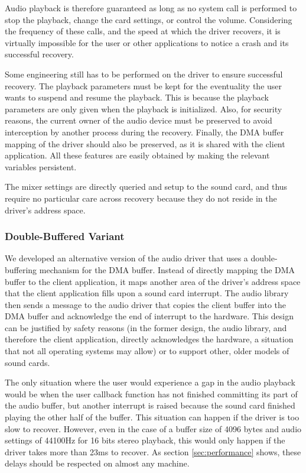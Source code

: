 \documentclass{report}
\begin{document}
Audio playback is therefore guaranteed as long as no system call is performed to stop the playback, change the card settings, or control the volume. Considering the frequency of these calls, and the speed at which the driver recovers, it is virtually impossible for the user or other applications to notice a crash and its successful recovery.

Some engineering still has to be performed on the driver to ensure successful recovery. The playback parameters must be kept for the eventuality the user wants to suspend and resume the playback.  This is because the playback parameters are only given when the playback is initialized. Also, for security reasons, the current owner of the audio device must be preserved to avoid interception by another process during the recovery. Finally, the DMA buffer mapping of the driver should also be preserved, as it is shared with the client application. All these features are easily obtained by making the relevant variables persistent.

The mixer settings are directly queried and setup to the sound card, and thus require no particular care across recovery because they do not reside in the driver's address space.

\subsubsection{Double-Buffered Variant}
We developed an alternative version of the audio driver that uses a double-buffering mechanism for the DMA buffer. Instead of directly mapping the DMA buffer to the client application, it maps another area of the driver's address space that the client application fills upon a sound card interrupt. The audio library then sends a message to the audio driver that copies the client buffer into the DMA buffer and acknowledge the end of interrupt to the hardware. This design can be justified by safety reasons (in the former design, the audio library, and therefore the client application, directly acknowledges the hardware, a situation that not all operating systems may allow) or to support other, older models of sound cards.

The only situation where the user would experience a gap in the audio playback would be when the user callback function has not finished committing its part of the audio buffer, but another interrupt is raised because the sound card finished playing the other half of the buffer. This situation can happen if the driver is too slow to recover. However, even in the case of a buffer size of 4096 bytes and audio settings of 44100Hz for 16 bits stereo playback, this would only happen if the driver takes more than 23ms to recover. As section \ref{sec:performance} shows, these delays should be respected on almost any machine.
\end{document}
